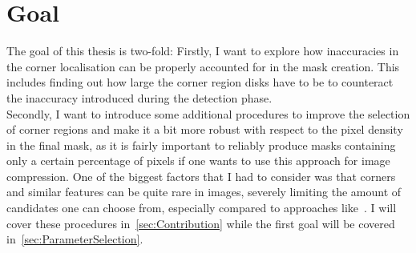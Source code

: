 \section{Goal}\label{sec:Goal}

The goal of this thesis is two-fold:
Firstly, I want to explore how inaccuracies in the corner localisation can be properly accounted
for in the mask creation. This includes finding out how large the corner region disks have to be to
counteract the inaccuracy introduced during the detection phase.\\
Secondly, I want to introduce some additional procedures to improve the selection of corner regions
and make it a bit more robust with respect to the pixel density in the final mask, as it is fairly
important to reliably produce masks containing only a certain percentage of pixels if one wants to
use this approach for image compression.
One of the biggest factors that I had to consider was that corners and similar features can be quite 
rare in images, severely limiting the amount of candidates one can choose from, especially compared to
approaches like~\cite{schmaltz09, hoeltgen12}. 
I will cover these procedures in~\ref{sec:Contribution} while the first goal will be covered
in~\ref{sec:ParameterSelection}.
